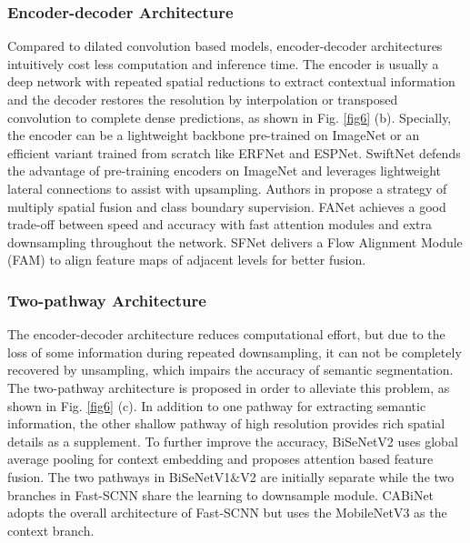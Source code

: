 \documentclass[journal]{IEEEtran}
\begin{document}
\subsubsection{Encoder-decoder Architecture}
Compared to dilated convolution based models, encoder-decoder architectures intuitively cost less computation and inference time.
The encoder is usually a deep network with repeated spatial reductions to extract contextual information and the decoder restores the resolution by interpolation or transposed convolution\cite{zeiler2010deconvolutional} to complete dense predictions, as shown in Fig. \ref{fig6} (b). Specially, the encoder can be a lightweight backbone pre-trained on ImageNet or an efficient variant trained from scratch like ERFNet\cite{romera2017erfnet} and ESPNet\cite{mehta2018espnet}. SwiftNet\cite{orsic2019defense} defends the advantage of pre-training encoders on ImageNet and leverages lightweight lateral connections to assist with upsampling. Authors in \cite{si2019real} propose a strategy of multiply spatial fusion and class boundary supervision. FANet \cite{hu2020real} achieves a good trade-off between speed and accuracy with fast attention modules and extra downsampling throughout the network. SFNet\cite{li2020semantic} delivers a Flow Alignment Module (FAM) to align feature maps of adjacent levels for better fusion.

\subsubsection{Two-pathway Architecture}

The encoder-decoder architecture reduces computational effort, but due to the loss of some information during repeated downsampling, it can not be completely recovered by unsampling, which impairs the accuracy of semantic segmentation. The two-pathway architecture is proposed in order to alleviate this problem\cite{yu2018bisenet}, as shown in Fig. \ref{fig6} (c). In addition to one pathway for extracting semantic information, the other shallow pathway of high resolution provides rich spatial details as a supplement. To further improve the accuracy, BiSeNetV2\cite{yu2020bisenet} uses global average pooling for context embedding and proposes attention based feature fusion. The two pathways in BiSeNetV1$\&$V2 are initially separate while the two branches in Fast-SCNN\cite{poudel2019fast} share the learning to downsample module. CABiNet\cite{kumaar2020cabinet} adopts the overall architecture of Fast-SCNN but uses the MobileNetV3\cite{howard2019searching} as the context branch. 
\end{document}
